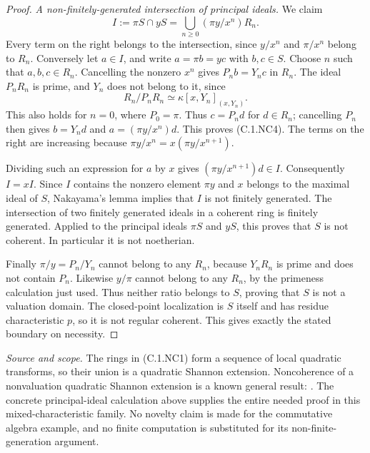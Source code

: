\begin{proof}
\emph{A non-finitely-generated intersection of principal ideals.}
We claim
\[
 I:=\pi S\cap yS
       =\bigcup_{n\geq0}(\pi y/x^n)R_n.         \tag{C.1.NC4}
\]
Every term on the right belongs to the intersection,
since $y/x^n$ and $\pi/x^n$ belong to $R_n$.
Conversely let $a\in I$, and write $a=\pi b=yc$
with $b,c\in S$.
Choose $n$ such that $a,b,c\in R_n$.  Cancelling the
nonzero $x^n$ gives
$P_n b=Y_n c$ in $R_n$.
The ideal $P_nR_n$ is prime, and $Y_n$ does not belong
to it, since
\[
 R_n/P_nR_n\simeq\kappa[x,Y_n]_{(x,Y_n)}.
\]
This also holds for $n=0$, where $P_0=\pi$.
Thus $c=P_nd$ for $d\in R_n$; cancelling $P_n$
then gives $b=Y_nd$ and
$a=(\pi y/x^n)d$.
This proves (C.1.NC4).
The terms on the right are increasing because
$\pi y/x^n=x(\pi y/x^{n+1})$.

Dividing such an expression for $a$ by $x$ gives
$(\pi y/x^{n+1})d\in I$.
Consequently $I=xI$.  Since $I$ contains the nonzero
element $\pi y$ and $x$ belongs to the maximal ideal of
$S$, Nakayama's lemma implies that $I$ is not finitely
generated.
The intersection of two finitely generated ideals in a
coherent ring is finitely generated.  Applied to the
principal ideals $\pi S$ and $yS$, this proves that $S$
is not coherent.  In particular it is not noetherian.

Finally $\pi/y=P_n/Y_n$ cannot belong to any $R_n$,
because $Y_nR_n$ is prime and does not contain $P_n$.
Likewise $y/\pi$ cannot belong to any $R_n$, by the
primeness calculation just used.
Thus neither ratio belongs to $S$, proving that $S$ is
not a valuation domain.
The closed-point localization is $S$ itself and has
residue characteristic $p$, so it is not regular coherent.
This gives exactly the stated boundary on necessity.
\end{proof}

\noindent\emph{Source and scope.}
The rings in (C.1.NC1) form a sequence of local quadratic
transforms, so their union is a quadratic Shannon
extension.  Noncoherence of a nonvaluation quadratic
Shannon extension is a known general result:
\cite[Theorem~6.2, especially its nonarchimedean
Case~1]{GuerrieriHeinzerOlberdingToeniskoetter2017}.
The concrete principal-ideal calculation above supplies
the entire needed proof in this mixed-characteristic
family.  No novelty claim is made for the commutative
algebra example, and no finite computation is substituted
for its non-finite-generation argument.
